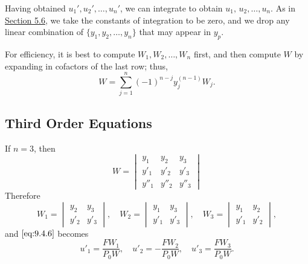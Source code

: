 \documentclass{ximera}
\begin{document}
Having obtained $u_1', u_2', \dots, u_n'$, we can integrate  to
obtain $u_1,\,u_2,\dots,u_n$. As in \href{https://xerxes.ximera.org/differentialequations/main/variationOfParameters/variationOfParameters}{Section 5.6}, we
take the constants
of integration to be zero, and we drop any linear combination of
$\{y_1,y_2,\dots,y_n\}$ that may appear in $y_p$.


\begin{remark}
For efficiency, it is best to compute $W_1, W_2, \dots, W_n$
first, and then compute $W$ by expanding in cofactors of the last row;
thus,
$$
W=\sum_{j=1}^n(-1)^{n-j}y_j^{(n-1)}W_j.
$$
\end{remark}



\subsection*{Third Order Equations}

If $n=3$, then
$$
W=\begin{vmatrix}
y_1&y_2&y_3 \\
y'_1&y'_2&y'_3 \\
y''_1&y''_2&y''_3 \end{vmatrix}
$$
Therefore
$$
W_1=\begin{vmatrix}
y_2&y_3 \\
y'_2&y'_3 \end{vmatrix},
\quad W_2=\begin{vmatrix}
y_1&y_3 \\
 y'_1&y'_3 \end{vmatrix},
\quad W_3=\begin{vmatrix}
y_1&y_2 \\
y'_1&y'_2 \end{vmatrix},
$$
and $\eqref{eq:9.4.6}$  becomes
\begin{equation} \label{eq:9.4.7}
u'_1=\frac{FW_1}{P_0W},\quad u'_2=-\frac{FW_2}{P_0W},\quad
u'_3=\frac{FW_3}{P_0W}.
\end{equation}
\end{document}
